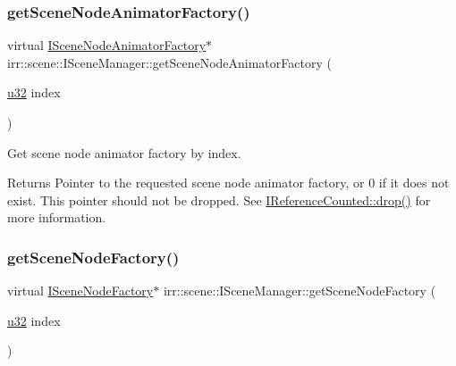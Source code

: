 \subsubsection{\texorpdfstring{get\+Scene\+Node\+Animator\+Factory()}{getSceneNodeAnimatorFactory()}}
{\footnotesize\ttfamily virtual \hyperlink{classirr_1_1scene_1_1ISceneNodeAnimatorFactory}{I\+Scene\+Node\+Animator\+Factory}$\ast$ irr\+::scene\+::\+I\+Scene\+Manager\+::get\+Scene\+Node\+Animator\+Factory (\begin{DoxyParamCaption}\item[{\hyperlink{namespaceirr_a0416a53257075833e7002efd0a18e804}{u32}}]{index }\end{DoxyParamCaption})\hspace{0.3cm}{\ttfamily [pure virtual]}}



Get scene node animator factory by index. 

\begin{DoxyReturn}{Returns}
Pointer to the requested scene node animator factory, or 0 if it does not exist. This pointer should not be dropped. See \hyperlink{classirr_1_1IReferenceCounted_a03856a09355b89d178090c4a5f738543}{I\+Reference\+Counted\+::drop()} for more information. 
\end{DoxyReturn}
\mbox{\label{classirr_1_1scene_1_1ISceneManager_ac912b9effd5ce46f5dc038e0568e614c}} 
\subsubsection{\texorpdfstring{get\+Scene\+Node\+Factory()}{getSceneNodeFactory()}}
{\footnotesize\ttfamily virtual \hyperlink{classirr_1_1scene_1_1ISceneNodeFactory}{I\+Scene\+Node\+Factory}$\ast$ irr\+::scene\+::\+I\+Scene\+Manager\+::get\+Scene\+Node\+Factory (\begin{DoxyParamCaption}\item[{\hyperlink{namespaceirr_a0416a53257075833e7002efd0a18e804}{u32}}]{index }\end{DoxyParamCaption})\hspace{0.3cm}{\ttfamily [pure virtual]}}



